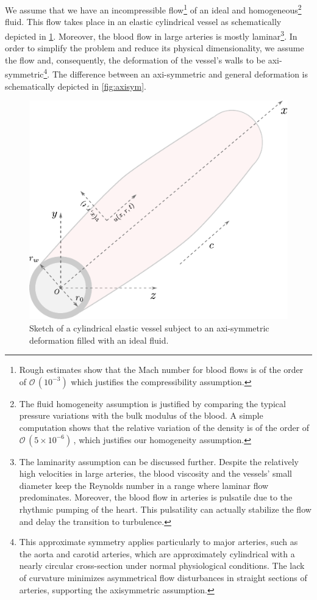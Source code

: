 \documentclass[alpha-refs, 12pt]{wiley-article}
\renewcommand{\O}{\mathcal{O}}
\begin{document}
We assume that we have an incompressible flow\footnote{Rough estimates show that the Mach number for blood flows is of the order of $\O\,(10^{-3})$ which justifies the compressibility assumption.} of an ideal and homogeneous\footnote{The fluid homogeneity assumption is justified by comparing the typical pressure variations with the bulk modulus of the blood. A simple computation shows that the relative variation of the density is of the order of $\O\,(5\times 10^{-6})\,$, which justifies our homogeneity assumption.} fluid. This flow takes place in an elastic cylindrical vessel as schematically depicted in \cref{fig:sketch3d}. Moreover, the blood flow in large arteries is mostly laminar\footnote{The laminarity assumption can be discussed further. Despite the relatively high velocities in large arteries, the blood viscosity and the vessels' small diameter keep the Reynolds number in a range where laminar flow predominates. Moreover, the blood flow in arteries is pulsatile due to the rhythmic pumping of the heart. This pulsatility can actually stabilize the flow and delay the transition to turbulence.}. In order to simplify the problem and reduce its physical dimensionality, we assume the flow and, consequently, the deformation of the vessel's walls to be axi-symmetric\footnote{This approximate symmetry applies particularly to major arteries, such as the aorta and carotid arteries, which are approximately cylindrical with a nearly circular cross-section under normal physiological conditions. The lack of curvature minimizes asymmetrical flow disturbances in straight sections of arteries, supporting the axisymmetric assumption.}. The difference between an axi-symmetric and general deformation is schematically depicted in \cref{fig:axisym}. 

\begin{figure}
    \centering
    \includegraphics[width=0.55\linewidth]{sketch.pdf}
    \caption{Sketch of a cylindrical elastic vessel subject to an axi-symmetric deformation filled with an ideal fluid.}
    \label{fig:sketch3d}
\end{figure}
\end{document}
